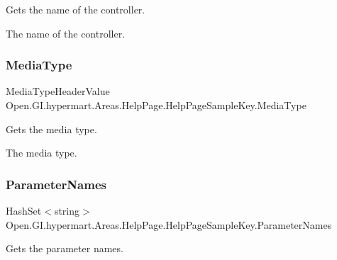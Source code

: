 Gets the name of the controller. 

The name of the controller. \hypertarget{class_open_1_1_g_i_1_1hypermart_1_1_areas_1_1_help_page_1_1_help_page_sample_key_a55d7490220ed44dd3611a3982b802850}{}\label{class_open_1_1_g_i_1_1hypermart_1_1_areas_1_1_help_page_1_1_help_page_sample_key_a55d7490220ed44dd3611a3982b802850} 
\subsubsection{\texorpdfstring{Media\+Type}{MediaType}}
{\footnotesize\ttfamily Media\+Type\+Header\+Value Open.\+G\+I.\+hypermart.\+Areas.\+Help\+Page.\+Help\+Page\+Sample\+Key.\+Media\+Type\hspace{0.3cm}{\ttfamily [get]}}



Gets the media type. 

The media type. \hypertarget{class_open_1_1_g_i_1_1hypermart_1_1_areas_1_1_help_page_1_1_help_page_sample_key_af57a533cea792e25a70fda6695a65c46}{}\label{class_open_1_1_g_i_1_1hypermart_1_1_areas_1_1_help_page_1_1_help_page_sample_key_af57a533cea792e25a70fda6695a65c46} 
\subsubsection{\texorpdfstring{Parameter\+Names}{ParameterNames}}
{\footnotesize\ttfamily Hash\+Set$<$string$>$ Open.\+G\+I.\+hypermart.\+Areas.\+Help\+Page.\+Help\+Page\+Sample\+Key.\+Parameter\+Names\hspace{0.3cm}{\ttfamily [get]}}



Gets the parameter names. 

